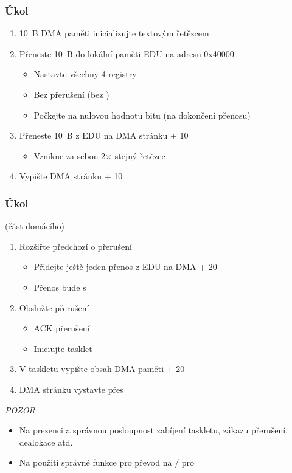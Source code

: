 \begin{frame}
  \frametitle{Úkol}

  \begin{enumerate}
    \item 10~B DMA paměti inicializujte textovým řetězcem
    \item Přeneste 10~B do lokální paměti EDU na adresu 0x40000
    \begin{itemize}
      \item Nastavte všechny 4 registry
      \item Bez přerušení (bez )
      \item Počkejte na nulovou hodnotu bitu  (na dokončení přenosu)
    \end{itemize}

    \item Přeneste 10~B z EDU na DMA stránku + 10
    \begin{itemize}
      \item Vznikne za sebou 2$\times$ stejný řetězec
    \end{itemize}

    \item Vypište DMA stránku + 10
  \end{enumerate}

\end{frame}

\begin{frame}
  \frametitle{Úkol}

   (část domácího)
  \begin{enumerate}
    \item Rozšiřte předchozí o přerušení
    \begin{itemize}
      \item Přidejte ještě jeden přenos z EDU na DMA + 20
      \item Přenos bude s 
    \end{itemize}

    \item Obslužte přerušení
    \begin{itemize}
      \item ACK přerušení
      \item Iniciujte tasklet
    \end{itemize}

    \item V taskletu vypište obsah DMA paměti + 20
    \item DMA stránku vystavte přes 
  \end{enumerate}

  \bigskip

  \emph{POZOR}
  \begin{itemize}
    \item Na prezenci a správnou posloupnost zabíjení taskletu, zákazu
      přerušení, dealokace atd.
    \item Na použití správné funkce pro převod na /
      pro 
  \end{itemize}

\end{frame}



